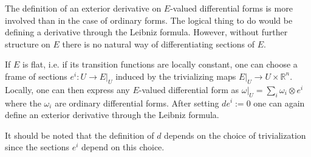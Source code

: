     \begin{construct}\label{diff:twisted_differential}
        The definition of an exterior derivative on $E$-valued differential forms is more involved than in the case of ordinary forms. The logical thing to do would be defining a derivative through the Leibniz formula. However, without further structure on $E$ there is no natural way of differentiating sections of $E$.

        If $E$ is flat, i.e. if its transition functions are locally constant, one can choose a frame of sections $e^i:U\rightarrow E|_U$ induced by the trivializing maps $E|_U\rightarrow U\times\mathbb{R}^n$. Locally, one can then express any $E$-valued differential form as $\omega|_U=\sum_i\omega_i\otimes e^i$ where the $\omega_i$ are ordinary differential forms. After setting $de^i:=0$ one can again define an exterior derivative through the Leibniz formula.
    \end{construct}
    \begin{remark}
        It should be noted that the definition of $d$ depends on the choice of trivialization since the sections $e^i$ depend on this choice.
    \end{remark}


